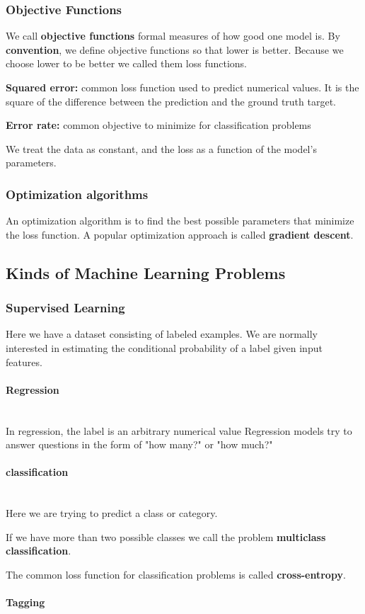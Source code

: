 \documentclass[]{article}
\newcommand{\eparagraph}[1]{\paragraph{#1}~\\}
\begin{document}
\subsubsection{Objective Functions}
We call \textbf{objective functions} formal measures of how good one model is.
By \textbf{convention}, we define objective functions so that lower is better.
Because we choose lower to be better we called them loss functions.

\textbf{Squared error:} common loss function used to predict numerical values. It
is the square of the difference between the prediction and the ground truth target.

\textbf{Error rate:} common objective to minimize for classification problems

We treat the data as constant, and the loss as a function of the model's parameters.

\subsubsection{Optimization algorithms}
An optimization algorithm is to find the best possible parameters that minimize the loss function.
A popular optimization approach is called \textbf{gradient descent}.

\subsection{Kinds of Machine Learning Problems}

\subsubsection{Supervised Learning}
Here we have a dataset consisting of labeled examples. We are normally interested
in estimating the conditional probability of a label given input features.

\eparagraph{Regression}

In regression, the label is an arbitrary numerical value
Regression models try to answer questions in the form of "how many?" or "how much?"

\eparagraph{classification}
Here we are trying to predict a class or category.

If we have more than two possible classes we call the problem \textbf{multiclass classification}.

The common loss function for classification problems is called \textbf{cross-entropy}.

\eparagraph{Tagging}




\end{document}
